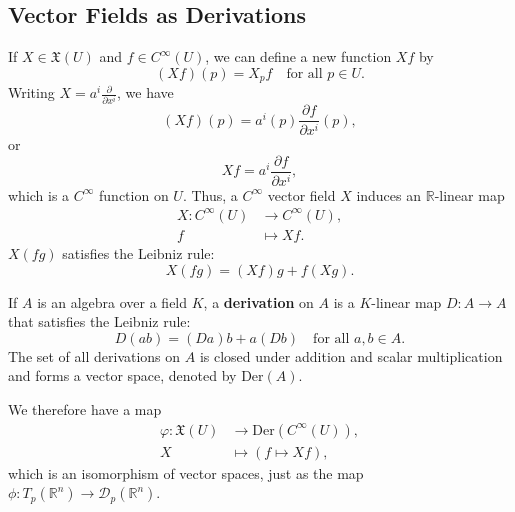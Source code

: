\documentclass[en, oneside]{vivi}
\begin{document}
\subsection{Vector Fields as Derivations}
If $X \in \mathfrak{X}(U)$ and $f \in C^\infty(U)$, we can define a new function $Xf$ by
\begin{equation*}
    (Xf)(p) = X_pf \quad \text{for all } p \in U.
\end{equation*}
Writing $X = a^i \frac{\partial}{\partial x^i}$, we have
\begin{equation*}
    (Xf)(p) = a^i(p) \frac{\partial f}{\partial x^i}(p),
\end{equation*}
or
\begin{equation*}
    Xf = a^i \frac{\partial f}{\partial x^i},
\end{equation*}
which is a $C^\infty$ function on $U$. Thus, a $C^\infty$ vector field $X$ induces an $\mathbb{R}$-linear map
\begin{align*}
    X: C^\infty(U) &\to C^\infty(U),\\
    f &\mapsto Xf.
\end{align*}
$X(fg)$ satisfies the Leibniz rule:
\begin{equation*}
    X(fg) = (Xf)g + f(Xg).
\end{equation*}
\begin{dfn}
    If $A$ is an algebra over a field $K$, a \textbf{derivation} on $A$ is a $K$-linear map $D: A \to A$ that satisfies the Leibniz rule:
    \begin{equation*}
        D(ab) = (Da)b + a(Db) \quad \text{for all } a, b \in A.
    \end{equation*}
    The set of all derivations on $A$ is closed under addition and scalar multiplication and forms a vector space, denoted by Der$(A)$.
\end{dfn}
We therefore have a map
\begin{align*}
    \varphi: \mathfrak{X}(U) &\to \text{Der}(C^\infty(U)),\\
    X &\mapsto (f \mapsto Xf),
\end{align*}
which is an isomorphism of vector spaces, just as the map $\phi: T_p(\mathbb{R}^n) \to \mathcal{D}_p(\mathbb{R}^n)$.
\end{document}

